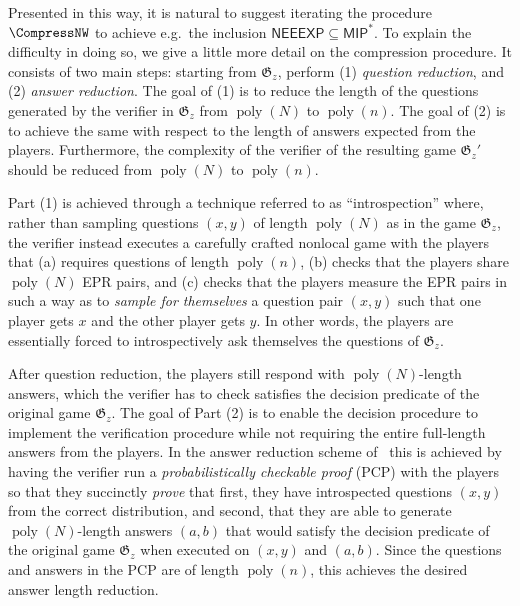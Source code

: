 \documentclass[11pt]{article}
\theoremstyle{definition}
\DeclareMathOperator{\poly}{poly}
\newcommand{\game}{\mathfrak{G}}
\newcommand{\class}[1]{\ensuremath{\mathsf{#1}}\xspace}
\newcommand{\MIP}{\class{MIP}} %
\newcommand{\NEEEXP}{\class{NEEEXP}}
\begin{document}
Presented in this way, it is natural to suggest iterating the procedure $\CompressNW$ to achieve e.g.\ the inclusion $\NEEEXP \subseteq \MIP^*$. To explain the difficulty in doing so, we give a little more detail on the compression procedure. It consists of two main steps: starting from $\game_z$, perform (1) \emph{question reduction}, and (2) \emph{answer reduction}. The goal of (1) is to reduce the length of the questions generated by the verifier in $\game_z$ from $\poly(N)$ to $\poly(n)$. The goal of (2) is to achieve the same with respect to the length of answers expected from the players. Furthermore, the complexity of the verifier of the resulting game $\game_z'$ should be reduced from $\poly(N)$ to  $\poly(n)$.
	
	Part (1) is achieved through a technique referred to as ``introspection'' where, rather than sampling questions $(x,y)$ of length $\poly(N)$ as in the game $\game_z$, the verifier instead executes a carefully crafted nonlocal game with the players that (a) requires questions of length $\poly(n)$, (b) checks that the players share $\poly(N)$ EPR pairs, and (c) checks that the players measure the EPR pairs in such a way as to \emph{sample for themselves} a question pair $(x,y)$ such that one player gets $x$ and the other player gets $y$. In other words, the players are essentially forced to introspectively ask themselves the questions of $\game_z$. 
	
	After question reduction, the players still respond with $\poly(N)$-length answers, which the verifier has to check satisfies the decision predicate of the original game $\game_z$. The goal of Part (2) is to enable the decision procedure to implement the verification procedure while not requiring the entire full-length answers from the players. In the answer reduction scheme of~\cite{NW19} this is achieved by having the verifier run a \emph{probabilistically checkable proof} (PCP) with the players so that they succinctly \emph{prove} that first, they have introspected questions $(x,y)$ from the correct distribution, and second, that they are able to generate $\poly(N)$-length answers $(a,b)$ that would satisfy the decision predicate of the original game $\game_z$ when executed on $(x,y)$ and $(a,b)$. Since the questions and answers in the PCP are of length $\poly(n)$, this achieves the desired answer length reduction.
	
\end{document}
